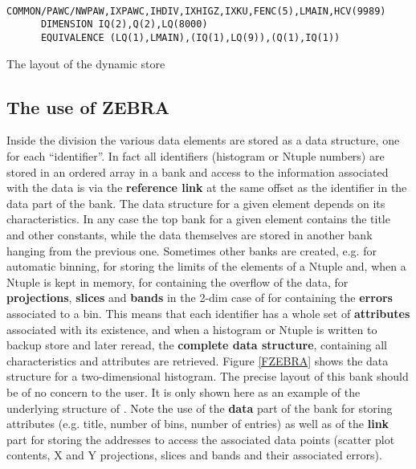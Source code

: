 \begin{Fighere}
\begin{verbatim}
      COMMON/PAWC/NWPAW,IXPAWC,IHDIV,IXHIGZ,IXKU,FENC(5),LMAIN,HCV(9989)
      DIMENSION IQ(2),Q(2),LQ(8000)
      EQUIVALENCE (LQ(1),LMAIN),(IQ(1),LQ(9)),(Q(1),IQ(1))
\end{verbatim}
\begin{center}
\mbox{}
\end{center}
\caption{The layout of the \protect{} dynamic store}
\label{FPAWSTOR}
\end{Fighere}

\subsection{The use of ZEBRA}
     
Inside the \HBOOK{} division the various data elements are
stored as a \ZEBRA{} data structure, one for each ``identifier''.
In fact all identifiers (histogram or Ntuple numbers)
are stored in an ordered array in a \ZEBRA{}
bank and access to the information associated with the \HBOOK{} data
is via the {\bf reference link} at the same offset as the
identifier in the data part of the bank. The data structure for
a given element depends on its characteristics.
In any case the top bank for a given element contains the
title and other constants, while the data themselves are
stored in another bank hanging from the previous one. Sometimes
other banks are created, e.g. for automatic binning,
for storing the limits of the elements of a Ntuple and,
when a Ntuple is kept in memory, for containing the overflow
of the data, for {\bf projections}, {\bf slices} and
{\bf bands} in the 2-dim case of for containing the {\bf errors}
associated to a bin. This means that each \HBOOK{} identifier
has a whole set of {\bf attributes} associated with its
existence, and when a histogram or Ntuple is written to backup
store and later reread, the {\bf complete data structure}, containing
all characteristics and attributes are retrieved.
Figure \ref{FZEBRA} shows
the \ZEBRA{} data structure for a two-dimensional histogram.
The precise layout of this bank should be of no concern to the
user. It is only shown here as an example of the underlying \ZEBRA{} structure
of \HBOOK. Note the use of the {\bf data} part of the bank for
storing attributes (e.g. title, number of bins, number of entries) as
well as of the {\bf link} part for storing the addresses to access the
associated data points (scatter plot contents, X and Y projections,
slices and bands and their associated errors).

